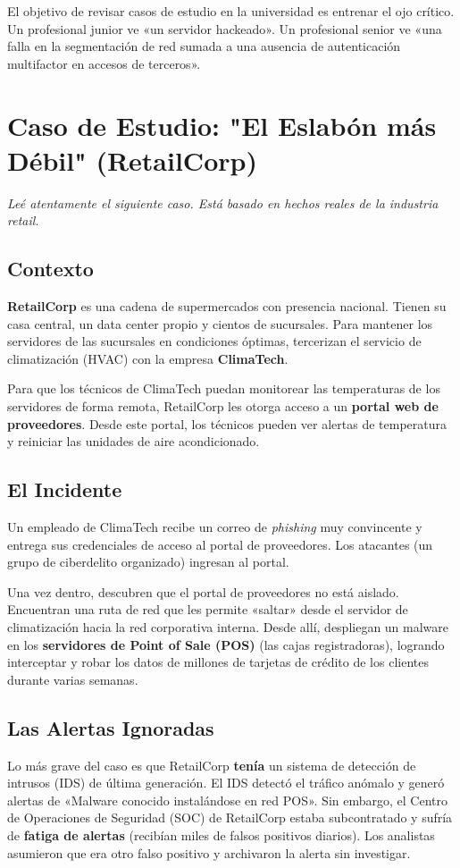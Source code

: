 \documentclass[11pt,a4paper]{article}
\begin{document}
El objetivo de revisar casos de estudio en la universidad es entrenar el ojo crítico. Un profesional junior ve «un servidor hackeado». Un profesional senior ve «una falla en la segmentación de red sumada a una ausencia de autenticación multifactor en accesos de terceros».

\section{Caso de Estudio: "El Eslabón más Débil" (RetailCorp)}
\textit{Leé atentamente el siguiente caso. Está basado en hechos reales de la industria retail.}

\subsection{Contexto}
\textbf{RetailCorp} es una cadena de supermercados con presencia nacional. Tienen su casa central, un data center propio y cientos de sucursales. Para mantener los servidores de las sucursales en condiciones óptimas, tercerizan el servicio de climatización (HVAC) con la empresa \textbf{ClimaTech}. 

Para que los técnicos de ClimaTech puedan monitorear las temperaturas de los servidores de forma remota, RetailCorp les otorga acceso a un \textbf{portal web de proveedores}. Desde este portal, los técnicos pueden ver alertas de temperatura y reiniciar las unidades de aire acondicionado.

\subsection{El Incidente}
Un empleado de ClimaTech recibe un correo de \textit{phishing} muy convincente y entrega sus credenciales de acceso al portal de proveedores. Los atacantes (un grupo de ciberdelito organizado) ingresan al portal. 

Una vez dentro, descubren que el portal de proveedores no está aislado. Encuentran una ruta de red que les permite «saltar» desde el servidor de climatización hacia la red corporativa interna. Desde allí, despliegan un malware en los \textbf{servidores de Point of Sale (POS)} (las cajas registradoras), logrando interceptar y robar los datos de millones de tarjetas de crédito de los clientes durante varias semanas.

\subsection{Las Alertas Ignoradas}
Lo más grave del caso es que RetailCorp \textbf{tenía} un sistema de detección de intrusos (IDS) de última generación. El IDS detectó el tráfico anómalo y generó alertas de «Malware conocido instalándose en red POS». Sin embargo, el Centro de Operaciones de Seguridad (SOC) de RetailCorp estaba subcontratado y sufría de \textbf{fatiga de alertas} (recibían miles de falsos positivos diarios). Los analistas asumieron que era otro falso positivo y archivaron la alerta sin investigar.
\end{document}
